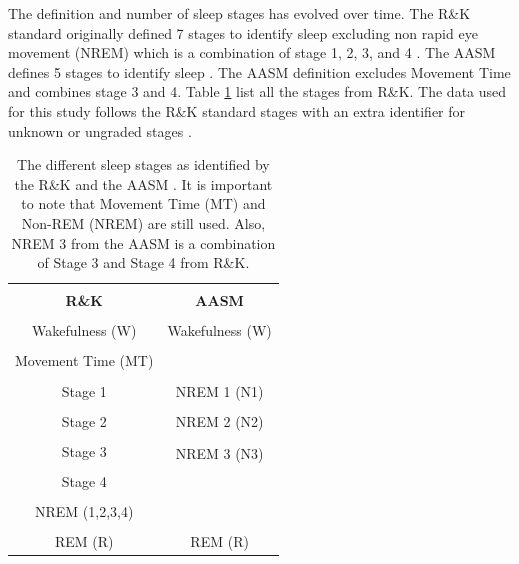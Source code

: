 \documentclass[12pt, oneside]{book}
\begin{document}
The definition and number of sleep stages has evolved over time. The R\&K standard originally defined 7 stages to identify sleep excluding non rapid eye movement (NREM) which is a combination of stage 1, 2, 3, and 4 \cite{rechtschaffen_manual_nodate}. The AASM defines 5 stages to identify sleep \cite{berry_md_chair_aasm_nodate}. The AASM definition excludes Movement Time and combines stage 3 and 4. Table \ref{tab:stage} list all the stages from R\&K. The data used for this study follows the R\&K standard stages with an extra identifier for unknown or ungraded stages \cite{noauthor_sleep-edf_nodate}.

\begin{table}[H]
	{\hspace{0cm}
		\begin{tabular}{|c|c|}
			\hline \\ [-1.5ex]
			\textbf{R\&K} & \textbf{AASM} \\
			\hline \\ [-1.5ex]
			Wakefulness (W) &	Wakefulness (W) \\
			\hline \\ [-1.5ex]
			Movement Time (MT) & \\
			\hline \\ [-1.5ex]	 
			Stage 1	& NREM 1 (N1) \\
			\hline \\ [-1.5ex]
			Stage 2	& NREM 2 (N2) \\
			\hline \\ [-1.5ex]
			Stage 3 & \multirow{2}{*}{NREM 3 (N3)}\\
			\cline{1-1} \\ [-1.5ex]
			Stage 4 & \\
			\hline \\ [-1.5ex]
			NREM (1,2,3,4)	& \\
			\hline \\ [-1.5ex] 
			REM (R) & REM (R)  \\
			\hline
		\end{tabular}
	} 
	\caption[The different sleep stages as identified by the R\&K \cite{rechtschaffen_manual_nodate} and the AASM \cite{berry_md_chair_aasm_nodate}.]{The different sleep stages as identified by the R\&K \cite{rechtschaffen_manual_nodate} and the AASM \cite{berry_md_chair_aasm_nodate}. It is important to note that Movement Time (MT) and Non-REM (NREM) are still used. Also, NREM 3 from the AASM is a combination of Stage 3 and Stage 4 from R\&K.}
	\label{tab:stage}
\end{table}
\end{document}
